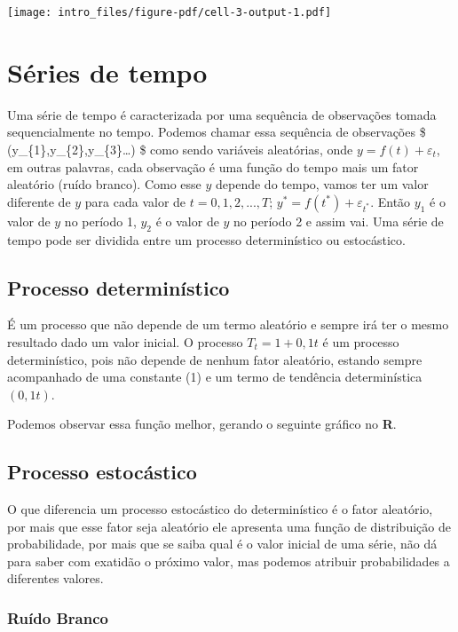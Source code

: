 \documentclass[
  letterpaper,
  DIV=11,
  numbers=noendperiod]{scrreprt}
\theoremstyle{definition}
\theoremstyle{plain}
\theoremstyle{remark}
\begin{document}
\texttt{[image: intro\_files/figure-pdf/cell-3-output-1.pdf]}

\section{Séries de tempo}\label{suxe9ries-de-tempo}

Uma série de tempo é caracterizada por uma sequência de observações
tomada sequencialmente no tempo. Podemos chamar essa sequência de
observações \$ (y\_\{1\},y\_\{2\},y\_\{3\}\ldots) \$ como sendo
variáveis aleatórias, onde \(y = f(t) + \varepsilon_{t}\), em outras
palavras, cada observação é uma função do tempo mais um fator aleatório
(ruído branco). Como esse \(y\) depende do tempo, vamos ter um valor
diferente de \(y\) para cada valor de \(t=0,1,2,...,T\);
\(y^{*} = f(t^{*}) + \varepsilon_{t^{*}}\). Então \(y_{1}\) é o valor de
\(y\) no período 1, \(y_{2}\) é o valor de \(y\) no período 2 e assim
vai. Uma série de tempo pode ser dividida entre um processo
determinístico ou estocástico.

\subsection{Processo determinístico}\label{processo-determinuxedstico}

É um processo que não depende de um termo aleatório e sempre irá ter o
mesmo resultado dado um valor inicial. O processo \(T_{t} = 1 + 0,1t\) é
um processo determinístico, pois não depende de nenhum fator aleatório,
estando sempre acompanhado de uma constante (1) e um termo de tendência
determinística \((0,1t)\).

Podemos observar essa função melhor, gerando o seguinte gráfico no
\textbf{R}.

\subsection{Processo estocástico}\label{processo-estocuxe1stico}

O que diferencia um processo estocástico do determinístico é o fator
aleatório, por mais que esse fator seja aleatório ele apresenta uma
função de distribuição de probabilidade, por mais que se saiba qual é o
valor inicial de uma série, não dá para saber com exatidão o próximo
valor, mas podemos atribuir probabilidades a diferentes valores.

\subsubsection{Ruído Branco}\label{ruuxeddo-branco}
\end{document}
